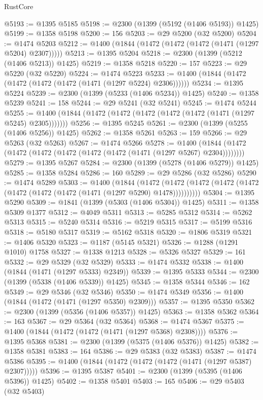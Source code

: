 \begin{lexlean}{RustCore}
\begin{coremodule}
@5193 := @1395 @5185
@5198 := @2300 (@1399 (@5192 (@1406 @5193)) @1425)
@5199 := @1358 @5198
@5200 := 156
@5203 := @29 @5200 (@32 @5200)
@5204 := @1474 @5203
@5212 := @1400 (@1844 (@1472 (@1472 (@1472 (@1471 (@1297 @5204) @2307)))))
@5213 := @1395 @5204
@5218 := @2300 (@1399 (@5212 (@1406 @5213)) @1425)
@5219 := @1358 @5218
@5220 := 157
@5223 := @29 @5220 (@32 @5220)
@5224 := @1474 @5223
@5233 := @1400 (@1844 (@1472 (@1472 (@1472 (@1472 (@1471 (@1297 @5224) @2306))))))
@5234 := @1395 @5224
@5239 := @2300 (@1399 (@5233 (@1406 @5234)) @1425)
@5240 := @1358 @5239
@5241 := 158
@5244 := @29 @5241 (@32 @5241)
@5245 := @1474 @5244
@5255 := @1400 (@1844 (@1472 (@1472 (@1472 (@1472 (@1472 (@1471 (@1297 @5245) @2305)))))))
@5256 := @1395 @5245
@5261 := @2300 (@1399 (@5255 (@1406 @5256)) @1425)
@5262 := @1358 @5261
@5263 := 159
@5266 := @29 @5263 (@32 @5263)
@5267 := @1474 @5266
@5278 := @1400 (@1844 (@1472 (@1472 (@1472 (@1472 (@1472 (@1472 (@1471 (@1297 @5267) @2304))))))))
@5279 := @1395 @5267
@5284 := @2300 (@1399 (@5278 (@1406 @5279)) @1425)
@5285 := @1358 @5284
@5286 := 160
@5289 := @29 @5286 (@32 @5286)
@5290 := @1474 @5289
@5303 := @1400
    (@1844
      (@1472 (@1472 (@1472 (@1472 (@1472 (@1472 (@1472 (@1472 (@1471 (@1297 @5290) @1478))))))))))
@5304 := @1395 @5290
@5309 := @1841 (@1399 (@5303 (@1406 @5304)) @1425)
@5311 := @1358 @5309 @1377
@5312 := @4049 @5311
@5313 := @5285 @5312
@5314 := @5262 @5313
@5315 := @5240 @5314
@5316 := @5219 @5315
@5317 := @5199 @5316
@5318 := @5180 @5317
@5319 := @5162 @5318
@5320 := @1806 @5319
@5321 := @1406 @5320
@5323 := @1187 (@5145 @5321)
@5326 := @1288 (@1291 @1010) @1758
@5327 := @1338 @1213
@5328 := @5326 @5327
@5329 := 161
@5332 := @29 @5329 (@32 @5329)
@5333 := @1474 @5332
@5338 := @1400 (@1844 (@1471 (@1297 @5333) @2349))
@5339 := @1395 @5333
@5344 := @2300 (@1399 (@5338 (@1406 @5339)) @1425)
@5345 := @1358 @5344
@5346 := 162
@5349 := @29 @5346 (@32 @5346)
@5350 := @1474 @5349
@5356 := @1400 (@1844 (@1472 (@1471 (@1297 @5350) @2309)))
@5357 := @1395 @5350
@5362 := @2300 (@1399 (@5356 (@1406 @5357)) @1425)
@5363 := @1358 @5362
@5364 := 163
@5367 := @29 @5364 (@32 @5364)
@5368 := @1474 @5367
@5375 := @1400 (@1844 (@1472 (@1472 (@1471 (@1297 @5368) @2308))))
@5376 := @1395 @5368
@5381 := @2300 (@1399 (@5375 (@1406 @5376)) @1425)
@5382 := @1358 @5381
@5383 := 164
@5386 := @29 @5383 (@32 @5383)
@5387 := @1474 @5386
@5395 := @1400 (@1844 (@1472 (@1472 (@1472 (@1471 (@1297 @5387) @2307)))))
@5396 := @1395 @5387
@5401 := @2300 (@1399 (@5395 (@1406 @5396)) @1425)
@5402 := @1358 @5401
@5403 := 165
@5406 := @29 @5403 (@32 @5403)

\end{coremodule}
\end{lexlean}
